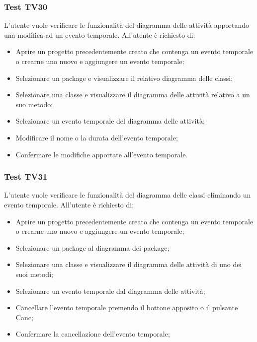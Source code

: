 \documentclass[../PianoDiQualifica.tex]{subfiles}
\begin{document}
	\subsubsection{Test TV30} 
	L'utente vuole verificare le funzionalità del diagramma delle attività apportando una modifica ad un evento temporale. 
	All'utente è richiesto di: 
	\begin{itemize} 
		\item Aprire un progetto precedentemente creato che contenga un evento temporale o crearne uno nuovo e aggiungere un evento temporale;
		\item Selezionare un package e visualizzare il relativo diagramma delle classi; 
		\item Selezionare una classe e visualizzare il diagramma delle attività relativo a un suo metodo; 
		\item Selezionare un evento temporale del diagramma delle attività;
		\item Modificare il nome o la durata dell'evento temporale; 
		\item Confermare le modifiche apportate all'evento temporale. 
	\end{itemize} 
	
	
	\subsubsection{Test TV31} 
	L'utente vuole verificare le funzionalità del diagramma delle classi eliminando un evento temporale. 
	All'utente è richiesto di: 
	\begin{itemize} 
		\item Aprire un progetto precedentemente creato che contenga un evento temporale o crearne uno nuovo e aggiungere un evento temporale;
		\item Selezionare un package al diagramma dei package; 
		\item Selezionare una classe e visualizzare il diagramma delle attività di uno dei suoi metodi; 
		\item Selezionare un evento temporale dal diagramma delle attività; 
		\item Cancellare l'evento temporale premendo il bottone apposito o il pulsante Canc; 
		\item Confermare la cancellazione dell'evento temporale; 
	\end{itemize} 
	
	
	
\end{document}
